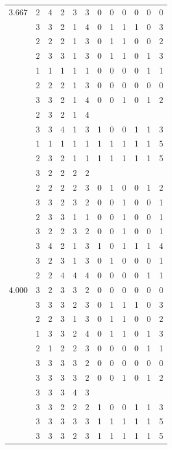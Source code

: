 \documentclass[]{msu-thesis}
\theoremstyle{definition}
\theoremstyle{definition}
\theoremstyle{definition}
\theoremstyle{remark}
\begin{document}
\begin{table}
{\begin{tabular}[t]{rrrrrrrrrrrr}
3.667 & 2 & 4 & 2 & 3 & 3 & 0 & 0 & 0 & 0 & 0 & 0\\
 & 3 & 3 & 2 & 1 & 4 & 0 & 1 & 1 & 1 & 0 & 3\\
 & 2 & 2 & 2 & 1 & 3 & 0 & 1 & 1 & 0 & 0 & 2\\
 & 2 & 3 & 3 & 1 & 3 & 0 & 1 & 1 & 0 & 1 & 3\\
 & 1 & 1 & 1 & 1 & 1 & 0 & 0 & 0 & 0 & 1 & 1\\
 & 2 & 2 & 2 & 1 & 3 & 0 & 0 & 0 & 0 & 0 & 0\\
 & 3 & 3 & 2 & 1 & 4 & 0 & 0 & 1 & 0 & 1 & 2\\
 & 2 & 3 & 2 & 1 & 4 &  &  &  &  &  & \\
 & 3 & 3 & 4 & 1 & 3 & 1 & 0 & 0 & 1 & 1 & 3\\
 & 1 & 1 & 1 & 1 & 1 & 1 & 1 & 1 & 1 & 1 & 5\\
 & 2 & 3 & 2 & 1 & 1 & 1 & 1 & 1 & 1 & 1 & 5\\
 & 3 & 2 & 2 & 2 & 2 &  &  &  &  &  & \\
 & 2 & 2 & 2 & 2 & 3 & 0 & 1 & 0 & 0 & 1 & 2\\
 & 3 & 3 & 2 & 3 & 2 & 0 & 0 & 1 & 0 & 0 & 1\\
 & 2 & 3 & 3 & 1 & 1 & 0 & 0 & 1 & 0 & 0 & 1\\
 & 3 & 2 & 2 & 3 & 2 & 0 & 0 & 1 & 0 & 0 & 1\\
 & 3 & 4 & 2 & 1 & 3 & 1 & 0 & 1 & 1 & 1 & 4\\
 & 3 & 2 & 3 & 1 & 3 & 0 & 1 & 0 & 0 & 0 & 1\\
 & 2 & 2 & 4 & 4 & 4 & 0 & 0 & 0 & 0 & 1 & 1\\
4.000 & 3 & 2 & 3 & 3 & 2 & 0 & 0 & 0 & 0 & 0 & 0\\
 & 3 & 3 & 3 & 2 & 3 & 0 & 1 & 1 & 1 & 0 & 3\\
 & 2 & 2 & 3 & 1 & 3 & 0 & 1 & 1 & 0 & 0 & 2\\
 & 1 & 3 & 3 & 2 & 4 & 0 & 1 & 1 & 0 & 1 & 3\\
 & 2 & 1 & 2 & 2 & 3 & 0 & 0 & 0 & 0 & 1 & 1\\
 & 3 & 3 & 3 & 3 & 2 & 0 & 0 & 0 & 0 & 0 & 0\\
 & 3 & 3 & 3 & 3 & 2 & 0 & 0 & 1 & 0 & 1 & 2\\
 & 3 & 3 & 3 & 4 & 3 &  &  &  &  &  & \\
 & 3 & 3 & 2 & 2 & 2 & 1 & 0 & 0 & 1 & 1 & 3\\
 & 3 & 3 & 3 & 3 & 3 & 1 & 1 & 1 & 1 & 1 & 5\\
 & 3 & 3 & 3 & 2 & 3 & 1 & 1 & 1 & 1 & 1 & 5\\

\end{tabular}}
\end{table}
\end{document}
